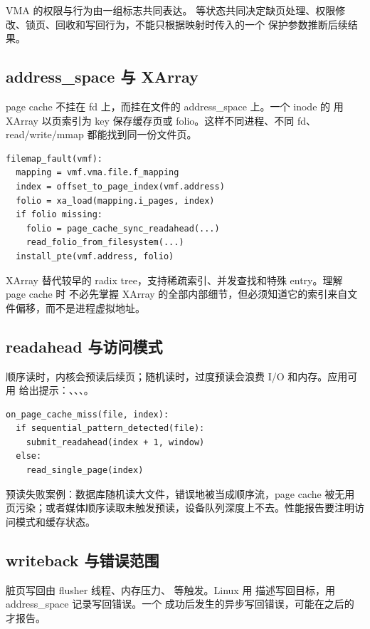 VMA 的权限与行为由一组标志共同表达。
等状态共同决定缺页处理、权限修改、锁页、回收和写回行为，不能只根据映射时传入的一个
保护参数推断后续结果。

\subsection{address\_space 与 XArray}

page cache 不挂在 fd 上，而挂在文件的 address\_space 上。一个 inode 的  用 XArray 以页索引为 key 保存缓存页或 folio。这样不同进程、不同 fd、read/write/mmap 都能找到同一份文件页。

\begin{lstlisting}
filemap_fault(vmf):
  mapping = vmf.vma.file.f_mapping
  index = offset_to_page_index(vmf.address)
  folio = xa_load(mapping.i_pages, index)
  if folio missing:
    folio = page_cache_sync_readahead(...)
    read_folio_from_filesystem(...)
  install_pte(vmf.address, folio)
\end{lstlisting}

XArray 替代较早的 radix tree，支持稀疏索引、并发查找和特殊 entry。理解 page cache 时
不必先掌握 XArray 的全部内部细节，但必须知道它的索引来自文件偏移，而不是进程虚拟地址。

\subsection{readahead 与访问模式}

顺序读时，内核会预读后续页；随机读时，过度预读会浪费 I/O 和内存。应用可用  给出提示：、、、。

\begin{lstlisting}
on_page_cache_miss(file, index):
  if sequential_pattern_detected(file):
    submit_readahead(index + 1, window)
  else:
    read_single_page(index)
\end{lstlisting}

预读失败案例：数据库随机读大文件，错误地被当成顺序流，page cache 被无用页污染；或者媒体顺序读取未触发预读，设备队列深度上不去。性能报告要注明访问模式和缓存状态。

\subsection{writeback 与错误范围}

脏页写回由 flusher 线程、内存压力、 等触发。Linux 用  描述写回目标，用 address\_space 记录写回错误。一个  成功后发生的异步写回错误，可能在之后的  才报告。

